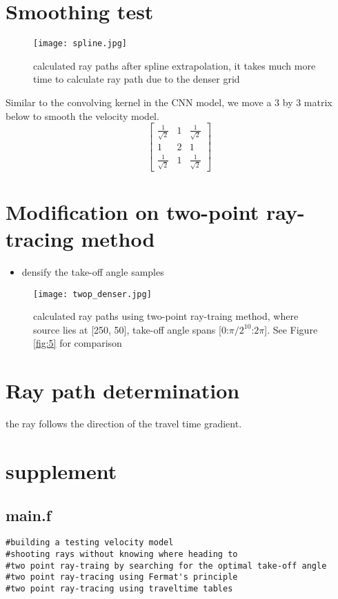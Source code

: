 \documentclass{article}
\begin{document}
\section{Smoothing test}
\begin{figure}[H]
\centering
\texttt{[image: spline.jpg]}
\caption{calculated ray paths after spline extrapolation, it takes much more time to calculate ray path due to the denser grid}
\end{figure}
Similar to the convolving kernel in the CNN model, we move a 3 by 3 matrix below to smooth the velocity model.
$$
\begin{bmatrix}
\frac{1}{\sqrt{2}} & 1 &  \frac{1}{\sqrt{2}}\\
1 & 2 & 1\\
\frac{1}{\sqrt{2}} & 1 &  \frac{1}{\sqrt{2}}
\end{bmatrix}
$$

\section{Modification on two-point ray-tracing method}
\begin{itemize}
\item densify the take-off angle samples
\end{itemize}
\begin{figure}[H]
\centering
\texttt{[image: twop\_denser.jpg]}
\caption{calculated ray paths using two-point ray-traing method, where source lies at [250, 50], take-off angle spans [0:$\pi/2^{10}$:$2\pi$]. See Figure \ref{fig:5} for comparison}
\label{fig:10}
\end{figure}
\section{Ray path determination}
the ray follows the direction of the travel time gradient.
\section{supplement}
\subsection{main.f}
\begin{lstlisting}
#building a testing velocity model
#shooting rays without knowing where heading to
#two point ray-traing by searching for the optimal take-off angle
#two point ray-tracing using Fermat's principle
#two point ray-tracing using traveltime tables
\end{lstlisting}
\end{document}
